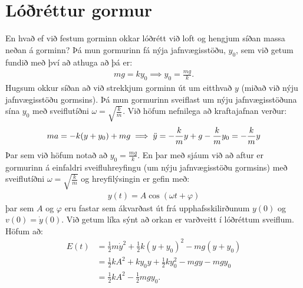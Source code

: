 \vspace{0.3cm}

\section{Lóðréttur gormur}

En hvað ef við festum gorminn okkar lóðrétt við loft og hengjum síðan massa neðan á gorminn? Þá mun gormurinn fá nýja jafnvægisstöðu, $y_0$, sem við getum fundið með því að athuga að þá er:
\begin{align*}
    mg = ky_0 \implies y_0 = \frac{mg}{k}.
\end{align*}
Hugsum okkur síðan að við strekkjum gorminn út um eitthvað $y$ (miðað við nýju jafnvægisstöðu gormsins). Þá mun gormurinn sveiflast um nýju jafnvægisstöðuna sína $y_0$ með sveiflutíðni $\omega = \sqrt{\frac{k}{m}}$. Við höfum nefnilega að kraftajafnan verður:
\begin{align*}
    ma = -k(y+y_0) + mg \implies \Ddot{y} =  -\frac{k}{m}y + g - \frac{k}{m}y_0 = -\frac{k}{m}y
\end{align*}
Þar sem við höfum notað að $y_0 = \frac{mg}{k}$. En þar með sjáum við að aftur er gormurinn á einfaldri sveifluhreyfingu (um nýju jafnvægisstöðu gormsins) með sveiflutíðni $\omega = \sqrt{\frac{k}{m}}$ og hreyfilýsingin er gefin með:
\begin{align*}
    y(t) = A \cos(\omega t + \varphi)
\end{align*}
þar sem $A$ og $\varphi$ eru fastar sem ákvarðast út frá upphafsskilirðunum $y(0)$ og $v(0) = \dot{y}(0)$. Við getum líka sýnt að orkan er varðveitt í lóðréttum sveiflum. Höfum að:
\begin{align*}
    E(t) &= \frac{1}{2}m\dot{y}^2 + \frac{1}{2}k(y + y_0)^2 - mg(y+y_0) \\
    &= \frac{1}{2}kA^2 + ky_0y + \frac{1}{2}ky_0^2 - mgy - mgy_0 \\
    &= \frac{1}{2}kA^2 - \frac{1}{2}mgy_0.
\end{align*}


